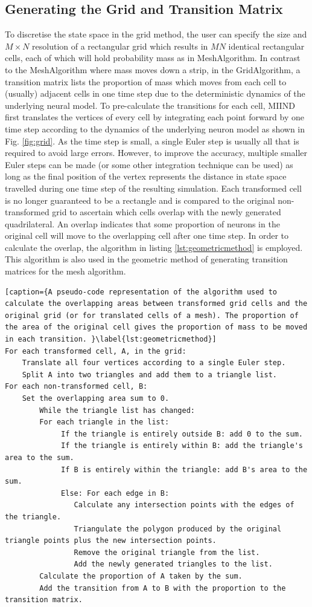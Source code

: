 \documentclass[utf8]{frontiersSCNS} %
\begin{document}
\subsection{Generating the Grid and Transition Matrix}
\label{gridgenerate}
To discretise the state space in the grid method, the user can specify the size and $M\times N$ resolution of a rectangular grid which results in $MN$ identical rectangular cells, each of which will hold probability mass as in MeshAlgorithm. In contrast to the MeshAlgorithm where mass moves down a strip, in the GridAlgorithm, a transition matrix lists the proportion of mass which moves from each cell to (usually) adjacent cells in one time step due to the deterministic dynamics of the underlying neural model. To pre-calculate the transitions for each cell, MIIND first translates the vertices of every cell by integrating each point forward by one time step according to the dynamics of the underlying neuron model as shown in Fig. \ref{fig:grid}. As the time step is small, a single Euler step is usually all that is required to avoid large errors. However, to improve the accuracy, multiple smaller Euler steps can be made (or some other integration technique can be used) as long as the final position of the vertex represents the distance in state space travelled during one time step of the resulting simulation. Each transformed cell is no longer guaranteed to be a rectangle and is compared to the original non-transformed grid to ascertain which cells overlap with the newly generated quadrilateral. An overlap indicates that some proportion of neurons in the original cell will move to the overlapping cell after one time step. In order to calculate the overlap, the algorithm in listing \ref{lst:geometricmethod} is employed. This algorithm is also used in the geometric method of generating transition matrices for the mesh algorithm.

\begin{lstlisting}[caption={A pseudo-code representation of the algorithm used to calculate the overlapping areas between transformed grid cells and the original grid (or for translated cells of a mesh). The proportion of the area of the original cell gives the proportion of mass to be moved in each transition. }\label{lst:geometricmethod}]
For each transformed cell, A, in the grid:
	Translate all four vertices according to a single Euler step.
	Split A into two triangles and add them to a triangle list.
For each non-transformed cell, B:
	Set the overlapping area sum to 0.
		While the triangle list has changed:
		For each triangle in the list:
			 If the triangle is entirely outside B: add 0 to the sum.
			 If the triangle is entirely within B: add the triangle's area to the sum.
			 If B is entirely within the triangle: add B's area to the sum.
			 Else: For each edge in B:
				Calculate any intersection points with the edges of the triangle.
				Triangulate the polygon produced by the original triangle points plus the new intersection points.
				Remove the original triangle from the list.
				Add the newly generated triangles to the list.
		Calculate the proportion of A taken by the sum.
		Add the transition from A to B with the proportion to the transition matrix.	
\end{lstlisting}
\end{document}
